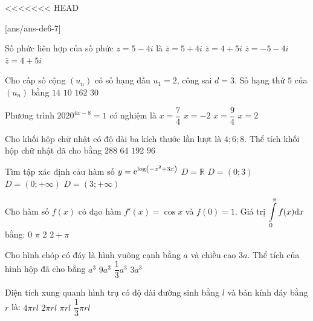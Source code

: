 <<<<<<< HEAD

\begin{name}
	{\tenchude}
	{\tendethi}
	{\tentruong}
	{\thoigian}
\end{name}
[ans/ans-de6-7]

\begin{ex}%
Số phức liên hợp của số phức $z=5-4 i$ là
\choice
{\True $\bar{z}=5+4 i$}
{$\bar{z}=4+5 i$}
{$\bar{z}=-5-4 i$}
{$\bar{z}=4+5 i$}

\end{ex}
\begin{ex}%
Cho cấp số cộng $\left(u_n\right)$ có số hạng đầu $u_1=2$, công sai $d=3$. Số hạng thứ $5$ của $\left(u_n\right)$ bằng
\choice
{\True $14$}
{$10$}
{$162$}
{$30$}

\end{ex}
\begin{ex}%
Phương trình $2020^{4 x-8}=1$ có nghiệm là
\choice
{$x=\dfrac{7}{4}$}
{$x=-2$}
{$x=\dfrac{9}{4}$}
{\True $x=2$}

\end{ex}
\begin{ex}%
Cho khối hộp chữ nhật có độ dài ba kích thước lần lượt là $4; 6; 8$. Thể tích khối hộp chữ nhật đã cho bằng
\choice
{$288$}
{$64$}
{\True $192$}
{$96$}

\end{ex}
\begin{ex}%
Tìm tập xác định cảu hàm số $y={\rm e}^{\log \left(-x^2+3 x\right)}$ 
\choice
{$D=\mathbb{R}$}
{$D=(0;3)$}
{$D=(0;+\infty)$}
{\True $D=(3;+\infty)$}

\end{ex}
\begin{ex}%
Cho hàm số $f(x)$ có đạo hàm $f'(x)=\cos x$ và $f(0)=1$. Giá trị $\displaystyle\displaystyle\int\limits_0^{\pi} f(x) \mathrm{d} x$ bằng:
\choice
{$0$}
{$\pi$}
{$2$}
{\True $2+\pi$}

\end{ex}
\begin{ex}%
Cho hình chóp có đáy là hình vuông cạnh bằng $a$ và chiều cao $3 a$. Thể tích của hình hộp đã cho bằng
\choice
{$a^3$}
{$9 a^3$}
{$\dfrac{1}{3} a^3$}
{\True $3 a^3$}

\end{ex}
\begin{ex}%
Diện tích xung quanh hình trụ có độ dài đường sinh bằng $l$ và bán kính đáy bằng $r$ là:
\choice
{$4\pi r l$}
{\True $2\pi r l$}
{$\pi r l$}
{$\dfrac{1}{3} \pi r l$}

\end{ex}
